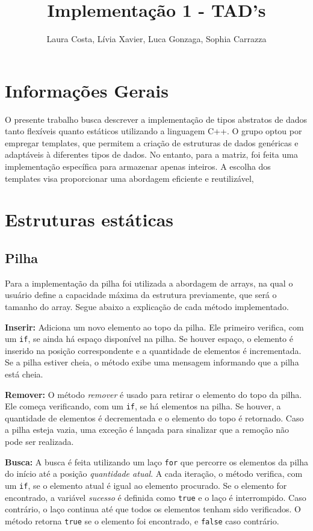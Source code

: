 \documentclass[12pt]{article}
\title{Implementação 1 - TAD's}
\author{Laura Costa\inst{1}, Lívia Xavier\inst{1}, Luca Gonzaga\inst{1}, Sophia Carrazza \inst{1} 
}
\begin{document}
 

\maketitle
\section{Informações Gerais}

O presente trabalho busca descrever a implementação de tipos abstratos de dados tanto flexíveis quanto estáticos utilizando a linguagem C++. O grupo optou por empregar templates, que permitem a criação de estruturas de dados genéricas e adaptáveis à diferentes tipos de dados. No entanto, para a matriz, foi feita uma implementação específica para armazenar apenas inteiros. A escolha dos templates visa proporcionar uma abordagem eficiente e reutilizável,

\section{Estruturas estáticas}
\subsection{Pilha}
Para a implementação da pilha foi utilizada a abordagem de arrays, na qual o usuário define a capacidade máxima da estrutura previamente, que será o tamanho do array. Segue abaixo a explicação de cada método implementado.

\textbf{Inserir:} Adiciona um novo elemento ao topo da pilha. Ele primeiro verifica, com um \texttt{if}, se ainda há espaço disponível na pilha. Se houver espaço, o elemento é inserido na posição correspondente e a quantidade de elementos é incrementada. Se a pilha estiver cheia, o método exibe uma mensagem informando que a pilha está cheia.

\textbf{Remover:} O método \textit{remover} é usado para retirar o elemento do topo da pilha. Ele começa verificando, com um \texttt{if}, se há elementos na pilha. Se houver, a quantidade de elementos é decrementada e o elemento do topo é retornado. Caso a pilha esteja vazia, uma exceção é lançada para sinalizar que a remoção não pode ser realizada.

\textbf{Busca:} A busca é feita utilizando um laço \texttt{for} que percorre os elementos da pilha do início até a posição \textit{quantidade atual}. A cada iteração, o método verifica, com um \texttt{if}, se o elemento atual é igual ao elemento procurado. Se o elemento for encontrado, a variável \textit{sucesso} é definida como \texttt{true} e o laço é interrompido. Caso contrário, o laço continua até que todos os elementos tenham sido verificados. O método retorna \texttt{true} se o elemento foi encontrado, e \texttt{false} caso contrário.
\end{document}
